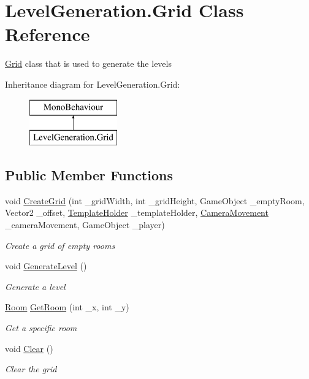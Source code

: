 \hypertarget{class_level_generation_1_1_grid}{}\section{Level\+Generation.\+Grid Class Reference}
\label{class_level_generation_1_1_grid}


\mbox{\hyperlink{class_level_generation_1_1_grid}{Grid}} class that is used to generate the levels  


Inheritance diagram for Level\+Generation.\+Grid\+:\begin{figure}[H]
\begin{center}
\leavevmode
\includegraphics[height=2.000000cm]{class_level_generation_1_1_grid}
\end{center}
\end{figure}
\subsection*{Public Member Functions}
\begin{DoxyCompactItemize}
\item 
void \mbox{\hyperlink{class_level_generation_1_1_grid_aafba1625abf1acd433a19d7b82c00ae2}{Create\+Grid}} (int \+\_\+grid\+Width, int \+\_\+grid\+Height, Game\+Object \+\_\+empty\+Room, Vector2 \+\_\+offset, \mbox{\hyperlink{class_level_generation_1_1_template_holder}{Template\+Holder}} \+\_\+template\+Holder, \mbox{\hyperlink{class_camera_movement}{Camera\+Movement}} \+\_\+camera\+Movement, Game\+Object \+\_\+player)
\begin{DoxyCompactList}\small\item\em Create a grid of empty rooms \end{DoxyCompactList}\item 
void \mbox{\hyperlink{class_level_generation_1_1_grid_aa69c03ea0068b2254d58d47615f67a80}{Generate\+Level}} ()
\begin{DoxyCompactList}\small\item\em Generate a level \end{DoxyCompactList}\item 
\mbox{\hyperlink{class_level_generation_1_1_room}{Room}} \mbox{\hyperlink{class_level_generation_1_1_grid_a82ed4d13492ff553b3a20388f96fb0f3}{Get\+Room}} (int \+\_\+x, int \+\_\+y)
\begin{DoxyCompactList}\small\item\em Get a specific room \end{DoxyCompactList}\item 
void \mbox{\hyperlink{class_level_generation_1_1_grid_a7ff44c0b5eeb4cc035b35f244089f33d}{Clear}} ()
\begin{DoxyCompactList}\small\item\em Clear the grid \end{DoxyCompactList}\end{DoxyCompactItemize}


